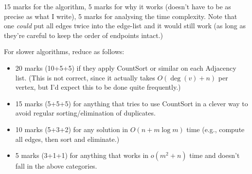 \begin{markingScheme}
15 marks for the algorithm, 5 marks for why it works (doesn't have to be
as precise as what I write), 5 marks for analysing the time complexity.
Note that one {\em could} put all edges twice into the edge-list and it
would still work (as long as they're careful to keep the order of endpoints
intact.)

For slower algorithms, reduce as follows:
\begin{itemize}
\item 20 marks (10+5+5) if they apply CountSort or similar on each Adjacency 
	list.
	(This is not correct, since it actually takes $O(\deg(v)+n)$ per vertex, 
	but I'd expect this to be done quite frequently.)
\item 15 marks (5+5+5) for anything that tries to use CountSort in a clever way 
	to avoid regular sorting/elimination of duplicates.  
\item 10 marks (5+3+2) for any solution in $O(n+m\log m)$ time 
	(e.g., compute all edges, then sort and eliminate.)
\item 5 marks (3+1+1) for anything that works in $o(m^2+n)$ time and 
	doesn't fall in the above categories.
\end{itemize}
\end{markingScheme}


